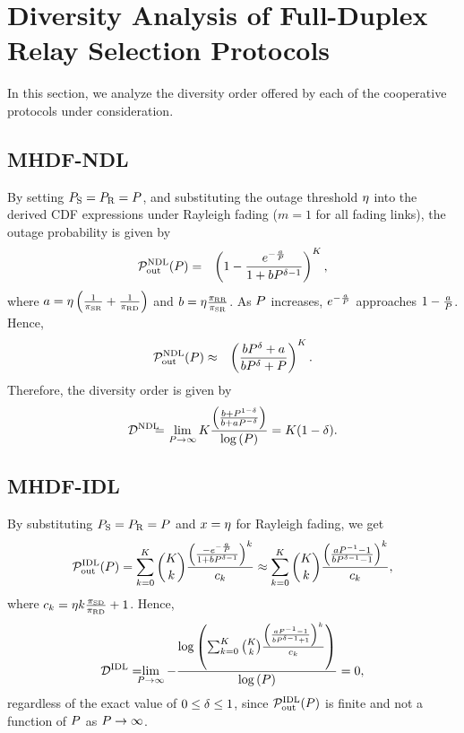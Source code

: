 \documentclass[10pt,journal]{IEEEtran}
\begin{document}
\section{Diversity Analysis of Full-Duplex Relay Selection Protocols}
%
In this section, we analyze the diversity order offered by each of the cooperative protocols under consideration.
\subsection{MHDF-NDL}
%
By setting $P_{{\rm S}}=P_{{\rm R}}=P$, and substituting the outage threshold $\eta$ into the derived \ac{CDF} expressions under Rayleigh fading ($m=1$ for all fading links), the outage probability is given by
\begin{eqnarray}
\mathcal{P}^{\text{NDL}}_{\text{out}}(P)
&=&\left(
1-\frac{e^{-\frac{a}{P}}}{1+b P^{\delta-1}}
\right)^K,
\end{eqnarray}
where $a=\eta\left(\frac{1}{{\pi_{{\rm S} {\rm R}}}}+\frac{1}{{\pi_{{\rm R} {\rm D}}}}\right)$ and $b=\eta\frac{{\pi_{{\rm R} {\rm R}}}}{{\pi_{{\rm S} {\rm R}}}}$. As $P$ increases, $e^{-\frac{a}{P}}$ approaches $1-\frac{a}{P}$. Hence,
\begin{eqnarray}
\mathcal{P}^{\text{NDL}}_{\text{out}}(P)
&\approx&\left(\frac{bP^\delta + a}{b P^\delta + P }\right)^K.
\end{eqnarray}
Therefore, the diversity order is given by
\begin{eqnarray}
\DNDL
\!\!\!\!&=&\!\!\!\!\lim_{\Pgen \rightarrow \infty} K \frac{\left(\frac{b + \Pgen^{1-\PWRSCL} }{b + a \Pgen^{-\PWRSCL}}\right)}{\log\left(\Pgen\right)} = K (1-\PWRSCL).
\end{eqnarray}
%
\subsection{MHDF-IDL}
%
By substituting $P_{{\rm S}}=P_{{\rm R}}=P$ and $x=\eta$ for Rayleigh fading, we get
\begin{equation}
\mathcal{P}^{\text{IDL}}_{\text{out}}(P)
= \sum_{k=0}^K {K \choose k}  \frac{\left(\frac{-e^{-\frac{a}{P}}}{1+b P^{\delta -1}}\right)^k}{c_k}\approx \sum_{k=0}^K {K \choose k}  \frac{\left(\frac{a P^{-1}-1}{b P^{\delta-1}-1}\right)^k}{c_k},
\end{equation}
where $c_k=\eta k\frac{{\pi_{{\rm S} {\rm D}}}}{{\pi_{{\rm R} {\rm D}}}}+1$. Hence,
\begin{eqnarray}
\mathcal{D}^{\text{IDL}}
=\!\!\!\!\lim_{P\rightarrow \infty} -\frac{\log\left(   \sum_{k=0}^K {K \choose k}  \frac{\left(\frac{a P^{-1}-1}{bP^{\delta-1}+1}\right)^k}{c_k}  \right)}{\log\left(P\right)}=0,\label{diversity_IDL}
\end{eqnarray}
regardless of the exact value of $0\le \delta \le 1$, since $\mathcal{P}^{\text{IDL}}_{\text{out}}(P)$ is finite and not a function of $P$ as $P \rightarrow \infty$.
%
\end{document}
